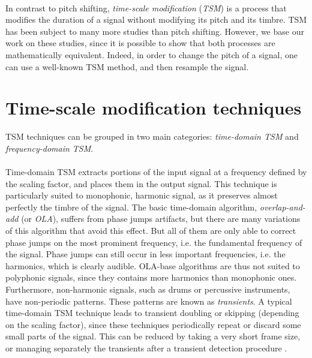 \documentclass[letterpaper]{article}
\theoremstyle{definition}
\theoremstyle{remark}
\begin{document}
\paragraph{}
In contrast to pitch shifting, \emph{time-scale modification} (\emph{TSM}) is a
process that modifies the duration of a signal without modifying its pitch and
its timbre. TSM has been subject to many more studies than pitch shifting.
However, we base our work on these studies, since it is possible to show that
both processes are mathematically equivalent. Indeed, in order to change the
pitch of a signal, one can use a well-known TSM method, and then resample the
signal.

\section{Time-scale modification techniques}
TSM techniques can be grouped in two main categories: \emph{time-domain TSM} and
\emph{frequency-domain TSM}.

\paragraph{}
Time-domain TSM extracts portions of the input signal at a frequency defined by
the scaling factor, and places them in the output signal. This technique is
particularly suited to monophonic, harmonic signal, as it preserves almost
perfectly the timbre of the signal. The basic time-domain algorithm,
\emph{overlap-and-add} (or \emph{OLA}), suffers from phase jumps artifacts, but
there are many variations of this algorithm that avoid this effect. But all of
them are only able to correct phase jumps on the most prominent frequency, i.e.
the fundamental frequency of the signal. Phase jumps can still occur in less
important frequencies, i.e. the harmonics, which is clearly audible. OLA-base
algorithms are thus not suited to polyphonic signals, since they contains more
harmonics than monophonic ones. Furthermore, non-harmonic signals, such as drums
or percussive instruments, have non-periodic patterns. These patterns are known
as \emph{transients}. A typical time-domain TSM technique leads to transient
doubling or skipping (depending on the scaling factor), since these techniques
periodically repeat or discard some small parts of the signal. This can be
reduced by taking a very short frame size, or managing separately the transients
after a transient detection procedure \citep{Grofit2008}.
\end{document}
